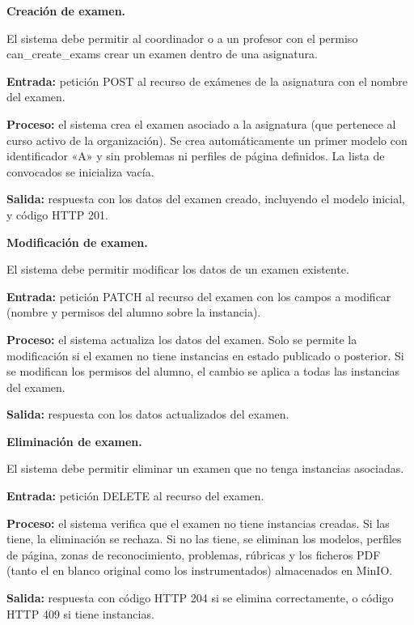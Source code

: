 \begin{functional}
  \begin{functional}
    \item \textbf{Creación de examen.}

    El sistema debe permitir al coordinador o a un profesor con el permiso can\_create\_exams crear un examen dentro de una asignatura.

    \textbf{Entrada:} petición POST al recurso de exámenes de la asignatura con el nombre del examen.

    \textbf{Proceso:} el sistema crea el examen asociado a la asignatura (que pertenece al curso activo de la organización). Se crea automáticamente un primer modelo con identificador «A» y sin problemas ni perfiles de página definidos. La lista de convocados se inicializa vacía.

    \textbf{Salida:} respuesta con los datos del examen creado, incluyendo el modelo inicial, y código HTTP 201.

    \item \textbf{Modificación de examen.}

    El sistema debe permitir modificar los datos de un examen existente.

    \textbf{Entrada:} petición PATCH al recurso del examen con los campos a modificar (nombre y permisos del alumno sobre la instancia).

    \textbf{Proceso:} el sistema actualiza los datos del examen. Solo se permite la modificación si el examen no tiene instancias en estado publicado o posterior. Si se modifican los permisos del alumno, el cambio se aplica a todas las instancias del examen.

    \textbf{Salida:} respuesta con los datos actualizados del examen.

    \item \textbf{Eliminación de examen.}

    El sistema debe permitir eliminar un examen que no tenga instancias asociadas.

    \textbf{Entrada:} petición DELETE al recurso del examen.

    \textbf{Proceso:} el sistema verifica que el examen no tiene instancias creadas. Si las tiene, la eliminación se rechaza. Si no las tiene, se eliminan los modelos, perfiles de página, zonas de reconocimiento, problemas, rúbricas y los ficheros PDF (tanto el en blanco original como los instrumentados) almacenados en MinIO.

    \textbf{Salida:} respuesta con código HTTP 204 si se elimina correctamente, o código HTTP 409 si tiene instancias.


\end{functional}
\end{functional}
